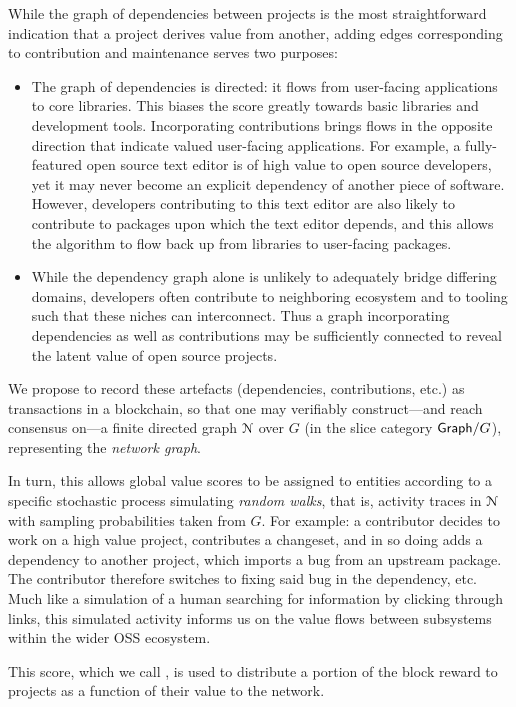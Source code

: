 While the graph of dependencies between projects is the most straightforward
indication that a project derives value from another, adding edges corresponding
to contribution and maintenance serves two purposes:
\begin{itemize}
\item The graph of dependencies is directed: it flows from user-facing applications to core
  libraries. This biases the score greatly towards basic libraries and
  development tools. Incorporating contributions brings flows in the
  opposite direction that indicate valued user-facing applications. For example,
  a fully-featured open source text editor is of high value to
  open source developers, yet it may never become an explicit dependency of another
  piece of software. However, developers contributing to this text editor are
  also likely to contribute to packages upon which the text editor depends, and this
  allows the algorithm to flow back up from libraries to user-facing
  packages.
\item While the dependency graph alone is unlikely to adequately bridge
  differing domains, developers often contribute to neighboring ecosystem and
  to tooling such that these niches can interconnect. Thus a graph incorporating
  dependencies as well as contributions may be sufficiently connected to
  reveal the latent value of open source projects.
\end{itemize}
We propose to record these artefacts (dependencies, contributions, etc.) as
transactions in a blockchain, so that one may verifiably construct---and reach
consensus on---a finite directed graph $\mathcal{N}$ over $G$ (\ie in the slice
category $\mathsf{Graph}/G$), representing the \oscoin{} \emph{network graph}.

In turn, this allows global value scores to be assigned to entities
according to a specific stochastic process simulating \emph{random
  walks}, that is, activity traces in $\mathcal{N}$ with sampling
probabilities taken from $G$. For example: a contributor decides to
work on a high value project, contributes a changeset, and in so doing adds a
dependency to another project, which imports a bug from an upstream package. The
contributor therefore switches to fixing said bug in the dependency, etc. Much
like a simulation of a human searching for information by clicking through
links, this simulated activity informs us on the value flows
between subsystems within the wider OSS ecosystem.

This score, which we call \osrank{}, is used to distribute a portion of the
block reward to projects as a function of their value to the \oscoin{}
network.

